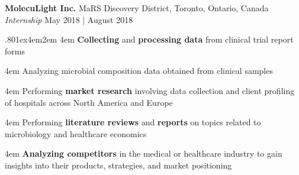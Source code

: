 \documentclass[a4paper,9pt]{extarticle}
\begin{document}
\noindent
\begin{minipage}{1\textwidth}
\setlength{\parindent}{15pt} %
	\noindent
	\textbf{MolecuLight Inc.} \hfill MaRS Discovery District, Toronto, Ontario, Canada\\ %
	\textit{Internship} \hfill May 2018 | August 2018  \par %
	{\hsize.80\linewidth\parskip1ex\hangindent4em\parindent2em 
	\setlength{\parskip}{0pt} %
		\hangindent4em	
		\textbf{Collecting} and \textbf{processing data} from clinical trial report forms \par %
		\hangindent4em
		Analyzing microbial composition data obtained from clinical samples \par
		\hangindent4em
		Performing \textbf{market research} involving data collection and client profiling of hospitals across North America and Europe  \par 
		\hangindent4em
		Performing \textbf{literature reviews} and \textbf{reports} on topics related to microbiology and healthcare economics \par %
		\hangindent4em
		\textbf{Analyzing competitors} in the medical or healthcare industry to gain insights into their products, strategies, and market positioning \par}
\end{minipage}

\end{document}

